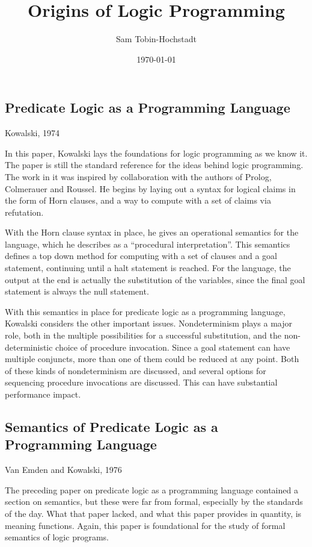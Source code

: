 \documentclass[12pt]{article}
\title{Origins of Logic Programming}
\author{Sam Tobin-Hochstadt}
\date{\today}
\begin{document}



\maketitle

\subsection*{Predicate Logic as a Programming Language}
Kowalski, 1974 \cite{kow74}

In this paper, Kowalski lays the foundations for logic programming as
we know it.  The paper is still the standard reference for the ideas
behind logic programming.  The work in it was inspired by
collaboration with the authors of Prolog, Colmerauer and
Roussel. \cite{col93} He begins by laying out a syntax for logical
claims in the form of Horn clauses, and a way to compute with a set of
claims via refutation.

With the Horn clause syntax in place, he gives an operational
semantics for the language, which he describes as a ``procedural
interpretation''.  This semantics defines a top down method for
computing with a set of clauses and a goal statement, continuing until
a halt statement is reached.  For the language, the output at the end
is actually the substitution of the variables, since the final goal
statement is always the null statement.  

With this semantics in place for predicate logic as a programming
language, Kowalski considers the other important issues.
Nondeterminism plays a major role, both in the multiple possibilities
for a successful substitution, and the non-deterministic choice of
procedure invocation.  Since a goal statement can have multiple
conjuncts, more than one of them could be reduced at any point.  Both
of these kinds of nondeterminism are discussed, and several options
for sequencing procedure invocations are discussed.  This can have
substantial performance impact.  

\subsection*{Semantics of Predicate Logic as a Programming Language}
Van Emden and Kowalski, 1976 \cite{kow76}

The preceding paper on predicate logic as a programming language
contained a section on semantics, but these were far from formal,
especially by the standards of the day.  What that paper lacked, and
what this paper provides in quantity, is meaning functions.  Again,
this paper is foundational for the study of formal semantics of logic
programs.  
\end{document}
